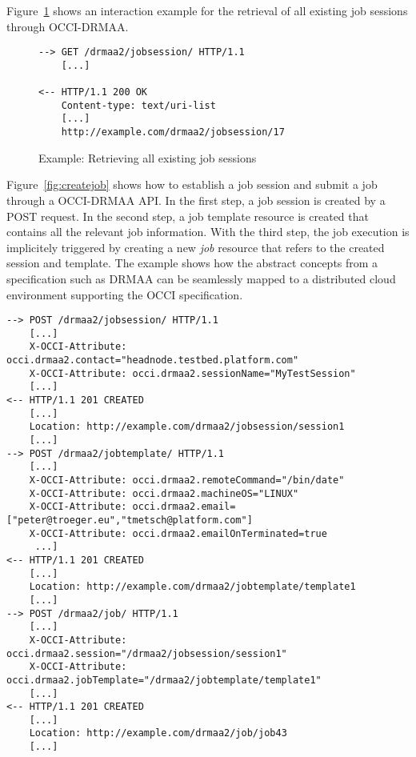 \documentclass[twocolumn]{svjour3}       %
\begin{document}
Figure~\ref{fig:getsessions} shows an interaction example for the retrieval of all existing job sessions through OCCI-DRMAA.

\begin{figure}
\begin{lstlisting}
--> GET /drmaa2/jobsession/ HTTP/1.1
    [...]

<-- HTTP/1.1 200 OK 
    Content-type: text/uri-list
    [...]
    http://example.com/drmaa2/jobsession/17
\end{lstlisting}
\caption{Example: Retrieving all existing job sessions}
\label{fig:getsessions} 
\end{figure}

Figure~\ref{fig:createjob} shows how to establish a job session and submit a job through a OCCI-DRMAA API. In the first step, a job session is created by a POST request. In the second step, a job template resource is created that contains all the relevant job information. With the third step, the job execution is implicitely triggered by creating a new \emph{job} resource that refers to the created session and template. The example shows how the abstract concepts from a specification such as DRMAA can be seamlessly mapped to a distributed cloud environment supporting the OCCI specification.

\begin{figure*}
\center
\begin{lstlisting}
--> POST /drmaa2/jobsession/ HTTP/1.1
    [...]
    X-OCCI-Attribute: occi.drmaa2.contact="headnode.testbed.platform.com"
    X-OCCI-Attribute: occi.drmaa2.sessionName="MyTestSession"
    [...]
<-- HTTP/1.1 201 CREATED 
    [...] 
    Location: http://example.com/drmaa2/jobsession/session1
    [...]
--> POST /drmaa2/jobtemplate/ HTTP/1.1
    [...]
    X-OCCI-Attribute: occi.drmaa2.remoteCommand="/bin/date"
    X-OCCI-Attribute: occi.drmaa2.machineOS="LINUX"
    X-OCCI-Attribute: occi.drmaa2.email=["peter@troeger.eu","tmetsch@platform.com"]
    X-OCCI-Attribute: occi.drmaa2.emailOnTerminated=true
     ...]
<-- HTTP/1.1 201 CREATED 
    [...] 
    Location: http://example.com/drmaa2/jobtemplate/template1
    [...]
--> POST /drmaa2/job/ HTTP/1.1
    [...]
    X-OCCI-Attribute: occi.drmaa2.session="/drmaa2/jobsession/session1"
    X-OCCI-Attribute: occi.drmaa2.jobTemplate="/drmaa2/jobtemplate/template1"
    [...]
<-- HTTP/1.1 201 CREATED 
    [...] 
    Location: http://example.com/drmaa2/job/job43
    [...]
\end{lstlisting}
\caption{Example: Creating a job session and submitting a job.}
\label{fig:createjob} 
\end{figure*}
\end{document}

